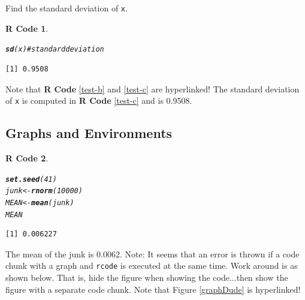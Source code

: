 \documentclass{article}\usepackage[]{graphicx}\usepackage[]{color}
\makeatletter
\newcommand{\hlnum}[1]{\textcolor[rgb]{0.686,0.059,0.569}{#1}}%
\newcommand{\hlcom}[1]{\textcolor[rgb]{0.678,0.584,0.686}{\textit{#1}}}%
\newcommand{\hlstd}[1]{\textcolor[rgb]{0.345,0.345,0.345}{#1}}%
\newcommand{\hlkwb}[1]{\textcolor[rgb]{0.69,0.353,0.396}{#1}}%
\newcommand{\hlkwd}[1]{\textcolor[rgb]{0.737,0.353,0.396}{\textbf{#1}}}%
\newenvironment{kframe}{%
 \def\at@end@of@kframe{}%
 \ifinner\ifhmode%
  \def\at@end@of@kframe{\end{minipage}}%
  \begin{minipage}{\columnwidth}%
 \fi\fi%
 \def\FrameCommand##1{\hskip\@totalleftmargin \hskip-\fboxsep
 \colorbox{shadecolor}{##1}\hskip-\fboxsep
     \hskip-\linewidth \hskip-\@totalleftmargin \hskip\columnwidth}%
 \MakeFramed {\advance\hsize-\width
   \@totalleftmargin\z@ \linewidth\hsize
   \@setminipage}}%
 {\par\unskip\endMakeFramed%
 \at@end@of@kframe}
\newenvironment{knitrout}{}{} %
\theoremstyle{rcode}
\newtheorem{rcode}{R Code}[section]
\newcommand{\noind}{\setlength{\parindent}{0pt}}
\makeatother
\begin{document}
\noind
Find the standard deviation of \texttt{x}.

\begin{knitrout}
\color{fgcolor}\begin{kframe}
\begin{rcode}\label{test-c}\hfill{}\begin{alltt}
\hlkwd{sd}\hlstd{(x)} \hlcom{# standard deviation   }
\end{alltt}
\begin{verbatim}
[1] 0.9508
\end{verbatim}
\end{rcode}\end{kframe}
\end{knitrout}


Note that \textbf{R Code} \vref{test-b} and \vref{test-c} are hyperlinked!  The standard deviation of \texttt{x} is computed in \textbf{R Code} \vref{test-c} and is 0.9508.

\clearpage
\subsection{Graphs and Environments}

\begin{knitrout}
\color{fgcolor}\begin{kframe}
\begin{rcode}\label{plot1}\hfill{}\begin{alltt}
\hlkwd{set.seed}\hlstd{(}\hlnum{41}\hlstd{)}
\hlstd{junk} \hlkwb{<-} \hlkwd{rnorm}\hlstd{(}\hlnum{10000}\hlstd{)}
\hlstd{MEAN} \hlkwb{<-} \hlkwd{mean}\hlstd{(junk)}
\hlstd{MEAN}
\end{alltt}
\begin{verbatim}
[1] 0.006227
\end{verbatim}
\end{rcode}\end{kframe}
\end{knitrout}


The mean of the junk is 0.0062.  Note: It seems that an error is thrown if
a code chunk with a graph and \texttt{rcode} is executed at the same time.  Work around is
as shown below.  That is, hide the figure when showing the code...then show the figure
with a separate code chunk.  Note that Figure \vref{graphDude} is hyperlinked!
\end{document}
